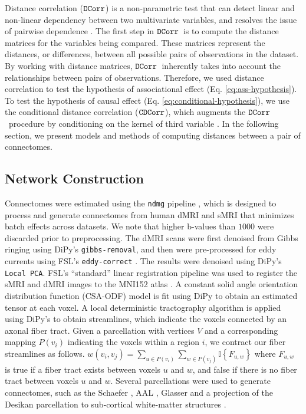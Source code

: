 Distance correlation ($\operatorname{\mathtt{DCorr}}$) is a non-parametric test that can detect linear and non-linear dependency between two multivariate variables, and resolves the issue of pairwise dependence \cite{szekely2007measuring, szekely2014partial}. The first step in $\operatorname{\mathtt{DCorr}}$\ is to compute the distance matrices for the variables being compared. These matrices represent the distances, or differences, between all possible pairs of observations in the dataset. By working with distance matrices, $\operatorname{\mathtt{DCorr}}$\ inherently takes into account the relationships between pairs of observations. Therefore, we used distance correlation to test the hypothesis of associational effect (Eq. \ref{eq:ass-hypothesis}). To test the hypothesis of causal effect (Eq. \ref{eq:conditional-hypothesis}), we use the conditional distance correlation ($\operatorname{\mathtt{CDCorr}}$), which augments the $\operatorname{\mathtt{DCorr}}$\ procedure by conditioning on the kernel of third variable \cite{wang2015conditional}. In the following section, we present models and methods of computing distances between a pair of connectomes. 

\subsection{Network Construction} \label{sec:network_construction}
Connectomes were estimated using the \texttt{ndmg} pipeline \cite{Kiar188706}, which is designed to process and generate connectomes from human dMRI and sMRI that minimizes batch effects across datasets. We note that higher b-values than $1000$ were discarded prior to preprocessing. The dMRI scans were first denoised from Gibbs ringing using DiPy's \texttt{gibbs-removal}, and then were pre-processed for eddy currents using FSL's \texttt{eddy-correct} \cite{fsl1}. The results were denoised using DiPy's \texttt{Local PCA}. FSL's ``standard'' linear registration pipeline was used to register the sMRI and dMRI images to the MNI152 atlas \cite{fsl1,fsl2,fsl3,mni152}. A constant solid angle orientation distribution function (CSA-ODF) model is fit using DiPy \cite{dipy} to obtain an estimated tensor at each voxel. A local deterministic tractography algorithm is applied using DiPy's \cite{dipy} to obtain streamlines, which indicate the voxels connected by an axonal fiber tract. Given a parcellation with vertices $V$ and a corresponding mapping $P(v_i)$ indicating the voxels within a region $i$, we contract our fiber streamlines as follows. $w(v_i, v_j) = \sum_{u \in P(v_i)}\sum_{w \in P(v_j)} \mathbb{I}\left\{ F_{u, w} \right\}$ where $F_{u, w}$ is true if a fiber tract exists between voxels $u$ and $w$, and false if there is no fiber tract between voxels $u$ and $w$. Several parcellations were used to generate connectomes, such as the Schaefer \cite{schaefer2018local}, AAL \cite{tzourio2002automated}, Glasser \cite{glasser2016multi} and a projection of the Desikan parcellation \cite{desikan2006automated} to sub-cortical white-matter structures \cite{Lawrence2021Mar}.


